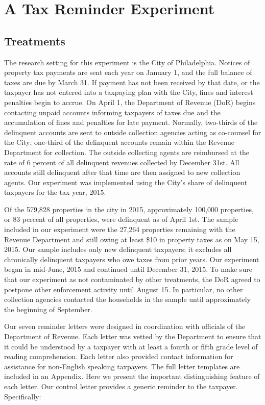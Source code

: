 \documentclass[12pt]{article}
\begin{document}
  
\section{ A Tax Reminder Experiment}
  
\subsection{Treatments}

The research setting for this experiment is the City of Philadelphia.
Notices of property tax payments are sent each year on January 1, and
the full balance of taxes are due by March 31.  If payment has not
been received by that date, or the taxpayer has not entered into a
taxpaying plan with the City, fines and interest penalties begin to
accrue.  On April 1, the Department of Revenue (DoR) begins contacting
unpaid accounts informing taxpayers of taxes due and the accumulation
of fines and penalties for late payment.  Normally, two-thirds of the
delinquent accounts are sent to outside collection agencies acting as
co-counsel for the City; one-third of the delinquent accounts remain
within the Revenue Department for collection.  The outside collecting
agents are reimbursed at the rate of 6 percent of all delinquent
revenues collected by December 31st.  All accounts still delinquent
after that time are then assigned to new collection agents.  Our
experiment was implemented using the City's share of delinquent
taxpayers for the tax year, 2015.
  
Of the 579,828 properties in the city in 2015, approximately 100,000
properties, or 83 percent of all properties, were delinquent as of
April 1st.  The sample included in our experiment were the 27,264
properties remaining with the Revenue Department and still owing at
least \$10 in property taxes as on May 15, 2015.  Our sample includes
only new delinquent taxpayers; it excludes all chronically delinquent
taxpayers who owe taxes from prior years.  Our experiment began in
mid-June, 2015 and continued until December 31, 2015.  To make sure
that our experiment as not contaminated by other treatments, the DoR
agreed to postpone other enforcement activity until August 15. In
particular, no other collection agencies contacted the households in
the sample until approximately the beginning of September.

Our seven reminder letters were designed in coordination with
officials of the Department of Revenue.  Each letter was vetted by the
Department to ensure that it could be understood by a taxpayer with at
least a fourth or fifth grade level of reading comprehension.  Each
letter also provided contact information for assistance for
non-English speaking taxpayers.  The full letter templates are
included in an Appendix.  Here we present the important distinguishing
feature of each letter.  Our control letter provides a generic
reminder to the taxpayer. Specifically:
 
\end{document}

